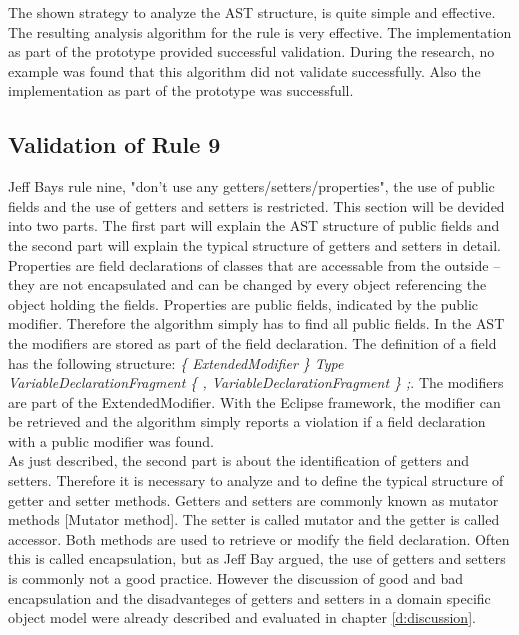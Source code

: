 The shown strategy to analyze the \ac{AST} structure, is quite simple and effective. 
\\

The resulting analysis algorithm for the rule is very effective. The implementation as part of the prototype provided successful validation. During the research, no example was found that this algorithm did not validate successfully. Also the implementation as part of the prototype was successfull. 

\subsection*{Validation of Rule 9}
Jeff Bays rule nine, "don't use any getters/setters/properties", the use of public fields and the use of getters and setters is restricted. This section will be devided into two parts. The first part will explain the AST structure of public fields and the second part will explain the typical structure of getters and setters in detail.
\\

Properties are field declarations of classes that are accessable from the outside -- they are not encapsulated and can be changed by every object referencing the object holding the fields. Properties are public fields, indicated by the public modifier. Therefore the algorithm simply has to find all public fields. In the \ac{AST} the modifiers are stored as part of the field declaration. The definition of a field has the following structure: \textit{\{ ExtendedModifier \} Type VariableDeclarationFragment \{ , VariableDeclarationFragment \} ;}. The modifiers are part of the ExtendedModifier. With the Eclipse framework, the modifier can be retrieved and the algorithm simply reports a violation if a field declaration with a public modifier was found. 
\\

As just described, the second part is about the identification of getters and setters. Therefore it is necessary to analyze and to define the typical structure of getter and setter methods. Getters and setters are commonly known as mutator methods \cite{wiki}[Mutator method]. The setter is called mutator and the getter is called accessor. Both methods are used to retrieve or modify the field declaration. Often this is called encapsulation, but as Jeff Bay argued, the use of getters and setters is commonly not a good practice. However the discussion of good and bad encapsulation and the disadvanteges of getters and setters in a domain specific object model were already described and evaluated in chapter \ref{d:discussion}.
\\

